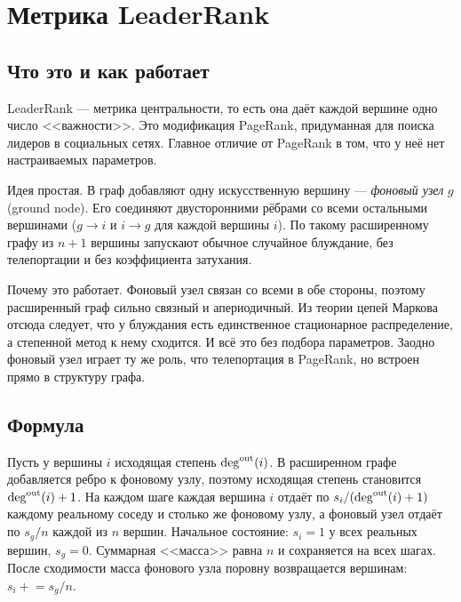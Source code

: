 \section{Метрика LeaderRank}
\label{sec:metric}

\subsection{Что это и как работает}
LeaderRank --- метрика центральности, то есть она даёт каждой вершине одно число
<<важности>>. Это модификация PageRank, придуманная для поиска лидеров в социальных
сетях. Главное отличие от PageRank в том, что у неё нет настраиваемых параметров.

Идея простая. В граф добавляют одну искусственную вершину --- \emph{фоновый узел} $g$ (ground node).
Его соединяют двусторонними рёбрами со всеми остальными вершинами ($g\to i$ и $i\to g$ для каждой
вершины $i$). По такому расширенному графу из $n+1$ вершины запускают обычное случайное блуждание,
без телепортации и без коэффициента затухания.

Почему это работает. Фоновый узел связан со всеми в обе стороны, поэтому расширенный граф сильно
связный и апериодичный. Из теории цепей Маркова отсюда следует, что у блуждания есть единственное
стационарное распределение, а степенной метод к нему сходится. И всё это без подбора параметров.
Заодно фоновый узел играет ту же роль, что телепортация в PageRank, но встроен прямо в структуру
графа.

\subsection{Формула}
Пусть у вершины $i$ исходящая степень $\deg^{\mathrm{out}}(i)$. В расширенном графе добавляется ребро к фоновому
узлу, поэтому исходящая степень становится $\deg^{\mathrm{out}}(i)+1$. На каждом шаге каждая вершина $i$ отдаёт
по $s_i/(\deg^{\mathrm{out}}(i)+1)$ каждому реальному соседу и столько же фоновому узлу, а фоновый узел отдаёт по
$s_g/n$ каждой из $n$ вершин. Начальное состояние: $s_i=1$ у всех реальных вершин, $s_g=0$. Суммарная
<<масса>> равна $n$ и сохраняется на всех шагах. После сходимости масса фонового узла поровну
возвращается вершинам: $s_i \mathrel{+}= s_g/n$.

